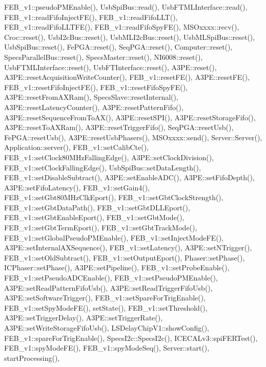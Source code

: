 F\+E\+B\+\_\+v1\+::pseudo\+P\+M\+Enable(), Usb\+Spi\+Bus\+::read(), Usb\+F\+T\+M\+L\+Interface\+::read(), F\+E\+B\+\_\+v1\+::read\+Fifo\+Inject\+F\+E(), F\+E\+B\+\_\+v1\+::read\+Fifo\+L\+L\+T(), F\+E\+B\+\_\+v1\+::read\+Fifo\+L\+L\+T\+F\+E(), F\+E\+B\+\_\+v1\+::read\+Fifo\+Spy\+F\+E(), M\+S\+Oxxxx\+::recv(), Croc\+::reset(), Usb\+I2c\+Bus\+::reset(), Usb\+M\+L\+I2c\+Bus\+::reset(), Usb\+M\+L\+Spi\+Bus\+::reset(), Usb\+Spi\+Bus\+::reset(), Fe\+P\+G\+A\+::reset(), Seq\+P\+G\+A\+::reset(), Computer\+::reset(), Specs\+Parallel\+Bus\+::reset(), Specs\+Master\+::reset(), N\+I6008\+::reset(), Usb\+F\+T\+M\+L\+Interface\+::reset(), Usb\+F\+T\+Interface\+::reset(), A3\+P\+E\+::reset(), A3\+P\+E\+::reset\+Acquisition\+Write\+Counter(), F\+E\+B\+\_\+v1\+::reset\+F\+E(), A3\+P\+E\+::reset\+F\+E(), F\+E\+B\+\_\+v1\+::reset\+Fifo\+Inject\+F\+E(), F\+E\+B\+\_\+v1\+::reset\+Fifo\+Spy\+F\+E(), A3\+P\+E\+::reset\+From\+A\+X\+Ram(), Specs\+Slave\+::reset\+Internal(), A3\+P\+E\+::reset\+Latency\+Counter(), A3\+P\+E\+::reset\+Pattern\+Fifo(), A3\+P\+E\+::reset\+Sequence\+From\+To\+A\+X(), A3\+P\+E\+::reset\+S\+P\+I(), A3\+P\+E\+::reset\+Storage\+Fifo(), A3\+P\+E\+::reset\+To\+A\+X\+Ram(), A3\+P\+E\+::reset\+Trigger\+Fifo(), Seq\+P\+G\+A\+::reset\+Usb(), Fe\+P\+G\+A\+::reset\+Usb(), A3\+P\+E\+::reset\+Usb\+Phasers(), M\+S\+Oxxxx\+::send(), Server\+::\+Server(), Application\+::server(), F\+E\+B\+\_\+v1\+::set\+Calib\+Cte(), F\+E\+B\+\_\+v1\+::set\+Clock80\+M\+Hz\+Falling\+Edge(), A3\+P\+E\+::set\+Clock\+Division(), F\+E\+B\+\_\+v1\+::set\+Clock\+Falling\+Edge(), Usb\+Spi\+Bus\+::set\+Data\+Length(), F\+E\+B\+\_\+v1\+::set\+Disable\+Subtract(), A3\+P\+E\+::set\+Enable\+A\+D\+C(), A3\+P\+E\+::set\+Fifo\+Depth(), A3\+P\+E\+::set\+Fifo\+Latency(), F\+E\+B\+\_\+v1\+::set\+Gain4(), F\+E\+B\+\_\+v1\+::set\+Gbt80\+M\+Hz\+Clk\+Eport(), F\+E\+B\+\_\+v1\+::set\+Gbt\+Clock\+Strength(), F\+E\+B\+\_\+v1\+::set\+Gbt\+Data\+Path(), F\+E\+B\+\_\+v1\+::set\+Gbt\+D\+L\+L\+Eport(), F\+E\+B\+\_\+v1\+::set\+Gbt\+Enable\+Eport(), F\+E\+B\+\_\+v1\+::set\+Gbt\+Mode(), F\+E\+B\+\_\+v1\+::set\+Gbt\+Term\+Eport(), F\+E\+B\+\_\+v1\+::set\+Gbt\+Track\+Mode(), F\+E\+B\+\_\+v1\+::set\+Global\+Pseudo\+P\+M\+Enable(), F\+E\+B\+\_\+v1\+::set\+Inject\+Mode\+F\+E(), A3\+P\+E\+::set\+Internal\+A\+X\+Sequence(), F\+E\+B\+\_\+v1\+::set\+Latency(), A3\+P\+E\+::set\+N\+Trigger(), F\+E\+B\+\_\+v1\+::set\+Old\+Subtract(), F\+E\+B\+\_\+v1\+::set\+Output\+Eport(), Phaser\+::set\+Phase(), I\+C\+Phaser\+::set\+Phase(), A3\+P\+E\+::set\+Pipeline(), F\+E\+B\+\_\+v1\+::set\+Probe\+Enable(), F\+E\+B\+\_\+v1\+::set\+Pseudo\+A\+D\+C\+Enable(), F\+E\+B\+\_\+v1\+::set\+Pseudo\+P\+M\+Enable(), A3\+P\+E\+::set\+Read\+Pattern\+Fifo\+Usb(), A3\+P\+E\+::set\+Read\+Trigger\+Fifo\+Usb(), A3\+P\+E\+::set\+Software\+Trigger(), F\+E\+B\+\_\+v1\+::set\+Spare\+For\+Trig\+Enable(), F\+E\+B\+\_\+v1\+::set\+Spy\+Mode\+F\+E(), set\+State(), F\+E\+B\+\_\+v1\+::set\+Threshold(), A3\+P\+E\+::set\+Trigger\+Delay(), A3\+P\+E\+::set\+Trigger\+Rate(), A3\+P\+E\+::set\+Write\+Storage\+Fifo\+Usb(), L\+S\+Delay\+Chip\+V1\+::show\+Config(), F\+E\+B\+\_\+v1\+::spare\+For\+Trig\+Enable(), Specs\+I2c\+::\+Specs\+I2c(), I\+C\+E\+C\+A\+Lv3\+::spi\+F\+E\+R\+Test(), F\+E\+B\+\_\+v1\+::spy\+Mode\+F\+E(), F\+E\+B\+\_\+v1\+::spy\+Mode\+Seq(), Server\+::start(), start\+Processing(), 